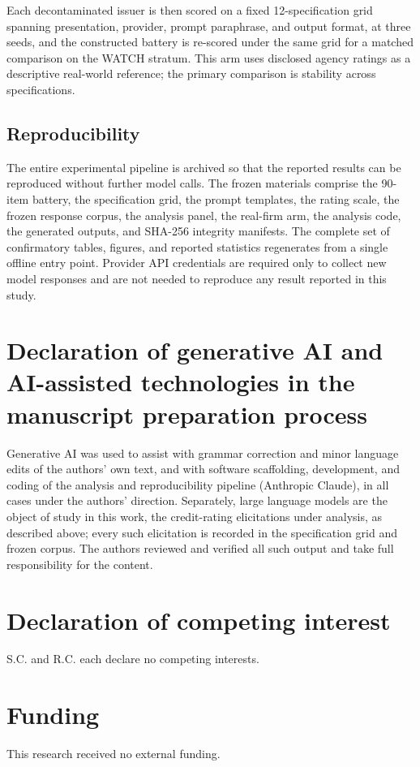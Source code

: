\documentclass[a4paper,fleqn]{cas-sc}
\begin{document}
Each decontaminated issuer is then scored on a fixed 12-specification grid spanning presentation,
provider, prompt paraphrase, and output format, at three seeds, and the constructed battery is re-scored
under the same grid for a matched comparison on the WATCH stratum. This arm uses disclosed agency ratings
as a descriptive real-world reference; the primary comparison is stability across specifications.

\subsection{Reproducibility}
The entire experimental pipeline is archived so that the reported results can be reproduced without
further model calls. The frozen materials comprise the 90-item battery, the specification grid, the
prompt templates, the rating scale, the frozen response corpus, the analysis panel, the real-firm arm,
the analysis code, the generated outputs, and SHA-256 integrity manifests. The complete set of
confirmatory tables, figures, and reported statistics regenerates from a single offline entry point.
Provider API credentials are required only to collect new model responses and are not needed to reproduce
any result reported in this study.

\section*{Declaration of generative AI and AI-assisted technologies in the manuscript preparation process}
Generative AI was used to assist with grammar correction and minor language edits of the authors' own
text, and with software scaffolding, development, and coding of the analysis and reproducibility pipeline
(Anthropic Claude), in all cases under the authors' direction. Separately, large language models are the
object of study in this work, the credit-rating elicitations under analysis, as described above; every
such elicitation is recorded in the specification grid and frozen corpus. The authors reviewed and
verified all such output and take full responsibility for the content.

\printcredits

\section*{Declaration of competing interest}
S.C. and R.C. each declare no competing interests.

\section*{Funding}
This research received no external funding.
\end{document}
